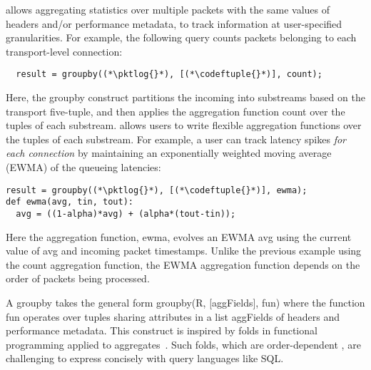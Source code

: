  \TheSystem allows
aggregating statistics over multiple packets with the same values of headers
and/or performance metadata, to track information at user-specified
granularities. For example, the following query counts packets belonging to each
transport-level connection:
\begin{lstlisting}
  result = groupby((*\pktlog{}*), [(*\codeftuple{}*)], count);
\end{lstlisting}
Here, the {\ct groupby} construct partitions the incoming {\ct \pktlog} into
substreams based on the transport five-tuple, and then applies the aggregation
function {\ct count} over the tuples of each substream.
\TheSystem allows users to write flexible aggregation functions over the
tuples of each substream. For example, a user can track latency spikes {\em
for each connection} by maintaining an exponentially weighted moving average
(EWMA) of the queueing latencies:
\begin{lstlisting}
result = groupby((*\pktlog{}*), [(*\codeftuple{}*)], ewma);
def ewma(avg, tin, tout):
  avg = ((1-alpha)*avg) + (alpha*(tout-tin));
\end{lstlisting}
Here the aggregation function, {\ct ewma}, evolves an EWMA {\ct avg} using the
current value of {\ct avg} and incoming packet timestamps. Unlike the previous
example using the {\ct count} aggregation function, the EWMA aggregation
function depends on the order of packets being processed.

A {\ct groupby} takes the general form {\ct groupby(R, [aggFields], fun)} where
the function {\ct fun} operates over tuples sharing attributes in a list {\ct
  aggFields} of headers and performance metadata. This construct is inspired by
{\ct fold}s in functional programming applied to
aggregates~\cite{comprehensive-comprehensions}. Such {\ct fold}s, which are order-dependent
, are challenging to express concisely with query languages like SQL.

